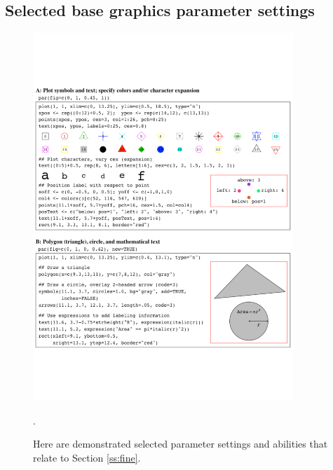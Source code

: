 \subsection*{Selected base graphics parameter settings}
\enlargethispage{12pt}
\begin{figure}
\vspace*{-10pt}

\centerline{\includegraphics[width=0.875\textwidth]{colorArt/gphpars}}

\caption{Here are demonstrated selected parameter settings and
abilities that relate to Section \ref{ss:fine}.\label{fig:pars}}.
\end{figure}

%
\vfill
